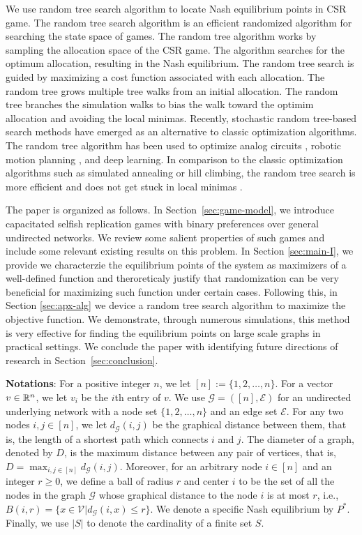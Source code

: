 We use random tree search algorithm to locate Nash equilibrium points in CSR game. The random tree search algorithm is an efficient randomized algorithm for searching the state space of games. The random tree algorithm works by sampling the allocation space of the CSR game. The algorithm searches for the optimum allocation, resulting in the Nash equilibrium.
The random tree search is guided by maximizing a cost function associated with each allocation. The random tree grows multiple tree walks from an initial allocation. The random tree branches the simulation walks to bias the walk toward the optimim allocation and avoiding the local minimas.
Recently, stochastic random tree-based search methods have emerged as an alternative to classic optimization algorithms.  The random tree algorithm has been used to optimize analog circuits \cite{adel2015}, robotic motion planning \cite{Lavalle2006}, and deep learning\cite{silver2016}. In comparison to the classic optimization algorithms such as simulated annealing or hill climbing, the random tree search is more efficient and does not get stuck in local minimas \cite{adel15, Lavalle2006}. 


The paper is organized as follows. In Section~\ref{sec:game-model}, we introduce capacitated selfish replication games with binary preferences over general undirected networks. We review some salient properties of such games and include some relevant existing results on this problem. In Section \ref{sec:main-I}, we provide we characterzie the equilibrium points of the system as maximizers of a well-defined function and theroreticaly justify that randomization can be very beneficial for maximizing such function under certain cases. Following this, in Section \ref{sec:apx-alg} we device a random tree search algorithm to maximize the objective function. We demonstrate, through numerous simulations, this method is very effective for finding the equilibrium points on large scale graphs in practical settings. We conclude the paper with identifying future directions of research in Section~\ref{sec:conclusion}.

\textbf{Notations}:
For a positive integer $n$, we let $[n]:=\{1,2,\ldots,n\}$. For a vector $v\in \mathbb{R}^n$, we let $v_i$ be the $i$th entry of $v$. We use $\mathcal{G}=([n], \mathcal{E})$ for an undirected underlying network with a node set $\{1,2,\ldots,n\}$ and an edge set $\mathcal{E}$. For any two nodes $i, j \in [n]$, we let $d_{\mathcal{G}}(i,j)$ be the graphical distance between them, that is, the length of a shortest path which connects $i$ and $j$. The diameter of a graph, denoted by $D$, is the maximum distance between any pair of vertices, that is, $D=\max_{i,j \in [n]} d_{\mathcal{G}}(i,j)$. Moreover, for an arbitrary node $i\in [n]$ and an integer $r\ge 0$, we define a ball of radius $r$ and center $i$ to be the set of all the nodes in the graph $\mathcal{G}$ whose graphical distance to the node $i$ is at most $r$, i.e., $B(i,r)=\{x\in \mathcal{V}| d_{\mathcal{G}}(i,x)\leq r\}$. We denote a specific Nash equilibrium by $P^*$. Finally, we use $|S|$ to denote the cardinality of a finite set $S$.
